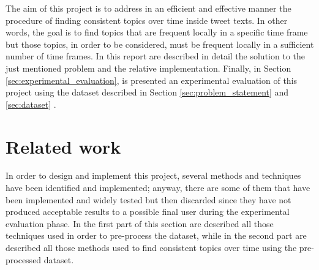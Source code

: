 The aim of this project is to address in an efficient and effective manner the procedure of finding consistent topics over time inside tweet texts. In other words, the goal is to find topics that are frequent locally in a specific time frame but those topics, in order to be considered, must be frequent locally in a sufficient number of time frames. In this report are described in detail the solution to the just mentioned problem and the relative implementation. Finally, in Section \ref{sec:experimental_evaluation}, is presented an experimental evaluation of this project using the dataset described in Section \ref{sec:problem_statement} and \ref{sec:dataset} \cite{covid19-tweets-dataset}.

\section{Related work}
\label{sec:related_word}
In order to design and implement this project, several methods and techniques have been identified and implemented; anyway, there are some of them that have been implemented and widely tested but then discarded since they have not produced acceptable results to a possible final user during the experimental evaluation phase. In the first part of this section are described all those techniques used in order to pre-process the dataset, while in the second part are described all those methods used to find consistent topics over time using the pre-processed dataset. 

